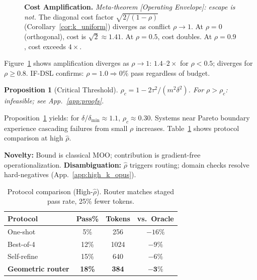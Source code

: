 \documentclass{article}
\theoremstyle{plain}
\newtheorem{proposition}[theorem]{Proposition}
\theoremstyle{definition}
\theoremstyle{remark}
\newcommand{\rhohat}{\hat{\rho}}
\newcommand{\appref}[1]{App.~\ref{#1}}
\begin{document}
\begin{figure}[ht]
\centering
{}
\caption{\textbf{Cost Amplification.} \emph{Meta-theorem [Operating Envelope]: escape is not.} The diagonal cost factor $\sqrt{2/(1-\rho)}$ (Corollary~\ref{cor:k_uniform}) diverges as conflict $\rho \to 1$. At $\rho=0$ (orthogonal), cost is $\sqrt{2}\approx 1.41$. At $\rho=0.5$, cost doubles. At $\rho=0.9$, cost exceeds $4\times$.}
\label{fig:amplification}
\end{figure}

Figure~\ref{fig:amplification} shows amplification diverges as $\rho \to 1$: $1.4$--$2\times$ for $\rho < 0.5$; diverges for $\rho \ge 0.8$. IF-DSL confirms: $\rho = 1.0 \Rightarrow 0\%$ pass regardless of budget.

\begin{proposition}[Critical Threshold]\label{prop:critical}
$\rho_c = 1 - 2\tau^2/(m^2\delta^2)$. For $\rho > \rho_c$: infeasible; see \appref{app:proofs}.
\end{proposition}

Proposition~\ref{prop:critical} yields: for $\delta/\delta_{\min} \approx 1.1$, $\rho_c \approx 0.30$. Systems near Pareto boundary experience cascading failures from small $\rho$ increases. Table~\ref{tab:baselines_main} shows protocol comparison at high $\rhohat$.

\noindent\textbf{Novelty:} Bound is classical MOO; contribution is gradient-free operationalization. \textbf{Disambiguation:} $\rhohat$ triggers routing; domain checks resolve hard-negatives (\appref{app:high_k_opus}).

\begin{table}[ht]
\centering
\small
\caption{Protocol comparison (High-$\rhohat$). Router matches staged pass rate, 25\% fewer tokens.}
\label{tab:baselines_main}
\begin{tabular}{lccc}
\toprule
Protocol & Pass\% & Tokens & vs.\ Oracle \\
\midrule
One-shot & 5\% & 256 & $-16\%$ \\
Best-of-4 & 12\% & 1024 & $-9\%$ \\
Self-refine & 15\% & 640 & $-6\%$ \\
\textbf{Geometric router} & \textbf{18\%} & \textbf{384} & $\mathbf{-3\%}$ \\
\bottomrule
\end{tabular}
\end{table}
\end{document}
